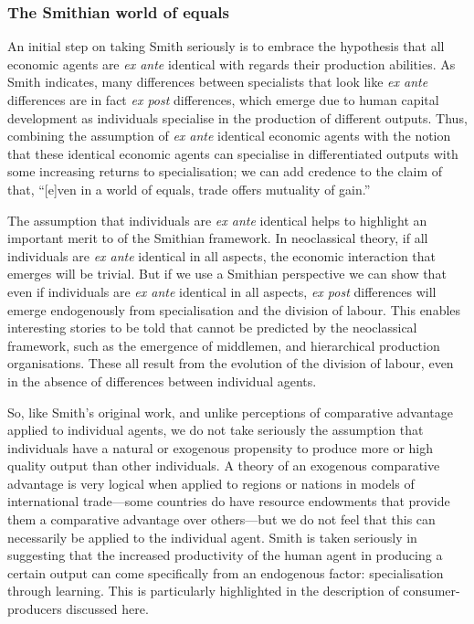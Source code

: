 \subsubsection{The Smithian world of equals}

An initial step on taking Smith seriously is to embrace the hypothesis that all economic agents are \textit{ex ante} identical with regards their production abilities. As Smith indicates, many differences between specialists that look like \textit{ex ante} differences are in fact \textit{ex post} differences, which emerge due to human capital development as individuals specialise in the production of different outputs. Thus, combining the assumption of \textit{ex ante} identical economic agents with the notion that these identical economic agents can specialise in differentiated outputs with some increasing returns to specialisation; we can add credence to the claim of \citet[p.~43]{BuchananYoon2000} that, ``[e]ven in a world of equals, trade offers mutuality of gain.''

The assumption that individuals are \textit{ex ante} identical helps to highlight an important merit to of the Smithian framework. In neoclassical theory, if all individuals are \textit{ex ante} identical in all aspects, the economic interaction that emerges will be trivial. But if we use a Smithian perspective we can show that even if individuals are \textit{ex ante} identical in all aspects, \textit{ex post} differences will emerge endogenously from specialisation and the division of labour. This enables interesting stories to be told that cannot be predicted by the neoclassical framework, such as the emergence of middlemen, and hierarchical production organisations. These all result from the evolution of the division of labour, even in the absence of differences between individual agents.

So, like Smith's original work, and unlike perceptions of comparative advantage applied to individual agents, we do not take seriously the assumption that individuals have a natural or exogenous propensity to produce more or high quality output than other individuals. A theory of an exogenous comparative advantage is very logical when applied to regions or nations in models of international trade---some countries do have resource endowments that provide them a comparative advantage over others---but we do not feel that this can necessarily be applied to the individual agent. Smith is taken seriously in suggesting that the increased productivity of the human agent in producing a certain output can come specifically from an endogenous factor: specialisation through learning. This is particularly highlighted in the description of consumer-producers discussed here.

